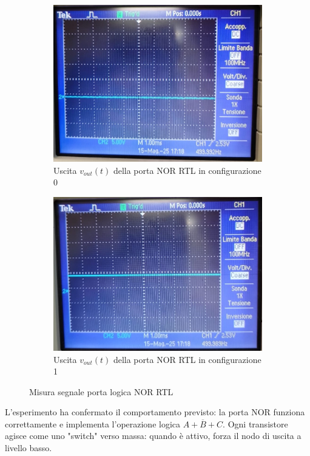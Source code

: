 \documentclass[a4paper,12pt]{article}
\begin{document}
\begin{figure}[H] 
  \centering
  \begin{subfigure}{0.45\textwidth}
    \includegraphics[width=\linewidth]{0.jpg}
    \caption{Uscita \(v_{out}(t)\) della porta NOR RTL in configurazione 0}
  \end{subfigure}
  \hfill
  \begin{subfigure}{0.45\textwidth}
    \includegraphics[width=\linewidth]{1.jpg}
    \caption{Uscita \(v_{out}(t)\) della porta NOR RTL in configurazione 1}
  \end{subfigure}
  \caption{Misura segnale porta logica NOR RTL}
\end{figure}

L’esperimento ha confermato il comportamento previsto: la porta NOR funziona correttamente e implementa l’operazione logica \(\overline{A + B + C}\). Ogni transistore agisce come uno "switch" verso massa: quando è attivo, forza il nodo di uscita a livello basso.
\end{document}
